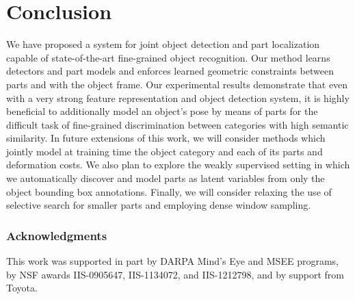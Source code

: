 \section{Conclusion}
We have proposed a system for joint object detection and part localization capable of state-of-the-art fine-grained object recognition. Our method learns detectors and part models and enforces learned geometric constraints between parts and with the object frame. 
Our experimental results demonstrate that even with a very strong feature representation and object detection system, it is highly beneficial to additionally model an object's pose by means of parts for the difficult task of fine-grained discrimination between categories with high semantic similarity.
In future extensions of this work, we will consider methods which jointly model at training time the object category and each of its parts and deformation costs.
We also plan to explore the weakly supervised setting in which we automatically discover and model parts as latent variables from only the object bounding box annotations.
Finally, we will consider relaxing the use of selective search for smaller parts and employing dense window sampling.

\subsubsection{Acknowledgments} This work was supported in part by DARPA Mind's Eye and MSEE
programs, by NSF awards IIS-0905647, IIS-1134072, and IIS-1212798, and
by support from Toyota.